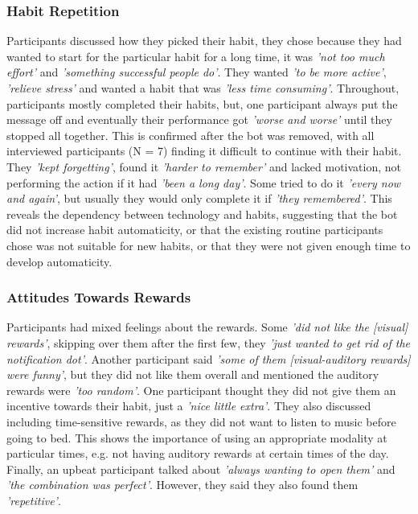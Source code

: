 \subsubsection*{Habit Repetition}
Participants discussed how they picked their habit, they chose because they had wanted to start for the particular habit for a long time, it was \textit{'not too much effort'} and \textit{'something successful people do'}. They wanted \textit{'to be more active'}, \textit{'relieve stress'} and wanted a habit that was \textit{'less time consuming'}. Throughout, participants mostly completed their habits, but, one participant always put the message off and eventually their performance got \textit{'worse and worse'} until they stopped all together. This is confirmed after the bot was removed, with all interviewed participants (N = 7) finding it difficult to continue with their habit. They \textit{'kept forgetting'}, found it \textit{'harder to remember'} and lacked motivation, not performing the action if it had \textit{'been a long day'}. Some tried to do it \textit{'every now and again'}, but usually they would only complete it if \textit{'they remembered'}. This reveals the dependency between technology and habits, suggesting that the bot did not increase habit automaticity, or that the existing routine participants chose was not suitable for new habits, or that they were not given enough time to develop automaticity.

\subsubsection*{Attitudes Towards Rewards}
Participants had mixed feelings about the rewards. Some \textit{'did not like the [visual] rewards'}, skipping over them after the first few, they \textit{'just wanted to get rid of the notification dot'}. Another participant said \textit{'some of them [visual-auditory rewards] were funny'}, but they did not like them overall and mentioned the auditory rewards were \textit{'too random'}. One participant thought they did not give them an incentive towards their habit, just a \textit{'nice little extra'}. They also discussed including time-sensitive rewards, as they did not want to listen to music before going to bed. This shows the importance of using an appropriate modality at particular times, e.g. not having auditory rewards at certain times of the day. Finally, an upbeat participant talked about \textit{'always wanting to open them'} and \textit{'the combination was perfect'}. However, they said they also found them \textit{'repetitive'}.

